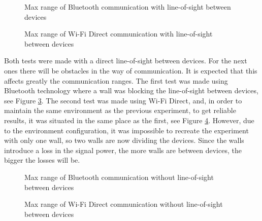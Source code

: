 \begin{figure}[ht]
   \noindent{}
	\caption{\label{fig:btMaxVisib} Max range of Bluetooth communication with line-of-sight between devices}
\end{figure}

\begin{figure}[ht]
   \noindent{}
	\caption{\label{fig:wfdMaxVisib} Max range of Wi-Fi Direct communication with line-of-sight between devices}
\end{figure}

Both tests were made with a direct line-of-sight between devices. For the next ones there will be obstacles in the way of communication. It is expected that this affects greatly the communication ranges. The first test was made using Bluetooth technology where a wall was blocking the line-of-sight between devices, see Figure \ref{fig:btMaxInv}. The second test was made using Wi-Fi Direct, and, in order to maintain the same environment as the previous experiment, to get reliable results, it was situated in the same place as the first, see Figure \ref{fig:wfdMaxInv}. However, due to the environment configuration, it was impossible to recreate the experiment with only one wall, so two walls are now dividing the devices. Since the walls introduce a loss in the signal power, the more walls are between devices, the bigger the losses will be.

\begin{figure}[ht]
   \noindent{}
	\caption{\label{fig:btMaxInv} Max range of Bluetooth communication without line-of-sight between devices}
\end{figure}

\begin{figure}[ht]
   \noindent{}
	\caption{\label{fig:wfdMaxInv} Max range of Wi-Fi Direct communication without line-of-sight between devices}
\end{figure}

